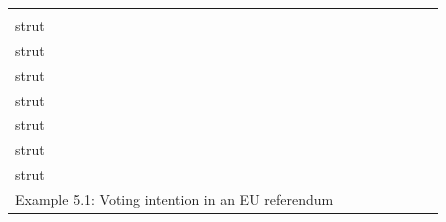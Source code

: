 \documentclass[11pt,a4paper,openany]{book}
\begin{document}
\begin{longtable}[]{@{}lrrrrrrr@{}}
\begin{minipage}[b]{0.05\columnwidth}
\\strut
\end{minipage} & \begin{minipage}[b]{0.04\columnwidth}\raggedleft\strut
\\strut
\end{minipage} & \begin{minipage}[b]{0.06\columnwidth}\raggedleft\strut
\\strut
\end{minipage} & \begin{minipage}[b]{0.11\columnwidth}\raggedleft\strut
\\strut
\end{minipage} & \begin{minipage}[b]{0.05\columnwidth}\raggedleft\strut
\\strut
\end{minipage} & \begin{minipage}[b]{0.05\columnwidth}\raggedleft\strut
\\strut
\end{minipage} & \begin{minipage}[b]{0.07\columnwidth}\raggedleft\strut
\\strut
\end{minipage}\tabularnewline
\midrule
\endhead
\begin{minipage}[t]{0.35\columnwidth}\raggedright\strut
Example 5.1: Voting intention in an EU referendum\strut
\end{minipage} & \begin{minipage}[t]{0.05\columnwidth}\raggedleft\strut
\strut
\end{minipage} & \begin{minipage}[t]{0.04\columnwidth}\raggedleft\strut
\strut
\end{minipage} & \begin{minipage}[t]{0.06\columnwidth}\raggedleft\strut
\strut
\end{minipage} & \begin{minipage}[t]{0.11\columnwidth}\raggedleft\strut
\strut
\end{minipage} & \begin{minipage}[t]{0.05\columnwidth}\raggedleft\strut
\strut
\end{minipage} & \begin{minipage}[t]{0.05\columnwidth}\raggedleft\strut
\strut
\end{minipage} & \begin{minipage}[t]{0.07\columnwidth}\raggedleft\strut
\strut

\end{minipage}
\end{longtable}
\end{document}
